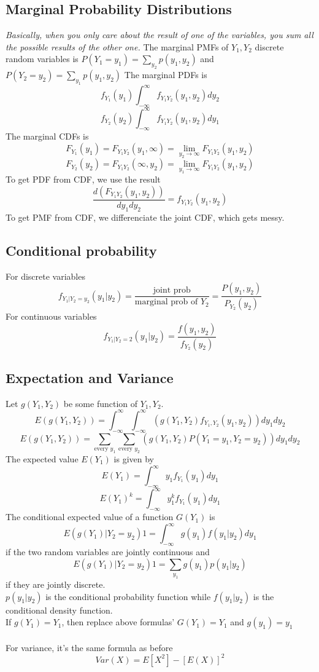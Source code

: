 \documentclass{article}
\begin{document}
\subsection{Marginal Probability Distributions}
\textit{Basically, when you only care about the result of one of the variables, you sum all the possible results of the other one.}
The marginal PMFs of $Y_1,Y_2$ discrete random variables is
$P(Y_1=y_1)=\sum_{y_2}p(y_1,y_2)$ and $P(Y_2=y_2)=\sum_{y_1}p(y_1,y_2)$
The marginal PDFs is 
\[f_{Y_1}(y_1)\int^\infty_{-\infty}f_{Y_1Y_2}(y_1,y_2)dy_2\]
\[f_{Y_2}(y_2)\int^\infty_{-\infty}f_{Y_1Y_2}(y_1,y_2)dy_1\]
The marginal CDFs is 
\[F_{Y_1}(y_1)=F_{Y_1Y_2}(y_1,\infty)=\lim_{y_2\to\infty}F_{Y_1Y_2}(y_1,y_2)\]
\[F_{Y_2}(y_2)=F_{Y_1Y_2}(\infty,y_2)=\lim_{y_1\to\infty}F_{Y_1Y_2}(y_1,y_2)\]
To get PDF from CDF, we use the result 
\[\frac{d(F_{Y_1Y_2}(y_1,y_2))}{dy_1dy_2}=f_{Y_1Y_2}(y_1,y_2)\]
To get PMF from CDF, we differenciate the joint CDF, which gets messy.
\subsection{Conditional probability}
For discrete variables
\[f_{Y_1|Y_2=y_2}(y_1|y_2)= \frac{\text{joint prob}}{\text{marginal prob of }Y_2}=\frac{P(y_1,y_2)}{P_{Y_2}(y_2)}\]
For continuous variables
\[f_{Y_1|Y_2=2}(y_1|y_2)=\frac{f(y_1,y_2)}{f_{Y_2}(y_2)}\]
\subsection{Expectation and Variance}
Let $g(Y_1,Y_2)$ be some function of $Y_1,Y_2$.
\[E(g(Y_1,Y_2))=\int^\infty_{-\infty}\int^\infty_{-\infty}(g(Y_1,Y_2)f_{Y_1,Y_2}(y_1,y_2))dy_1dy_2\]
\[E(g(Y_1,Y_2))=\sum_{\text{every }y_1}\sum_{\text{every }y_2}(g(Y_1,Y_2)P(Y_1=y_1,Y_2=y_2))dy_1dy_2\]
The expected value $E(Y_1)$ is given by
\[E(Y_1)=\int^\infty_{-\infty}y_1f_{Y_1}(y_1)dy_1\]
\[E(Y_1)^k=\int^\infty_{-\infty}y_1^kf_{Y_1}(y_1)dy_1\]
The conditional expected value of a function $G(Y_1)$ is
\[E(g(Y_1)|Y_2=y_2)1=\int^\infty_{-\infty}g(y_1)f(y_1|y_2)dy_1\]
if the two random variables are jointly continuous and 
\[E(g(Y_1)|Y_2=y_2)1=\sum_{y_1}g(y_1)p(y_1|y_2)\]
if they are jointly discrete.\\
$p(y_1|y_2)$ is the conditional probability function while $f(y_1|y_2)$ is the conditional density function.\\
If $g(Y_1)=Y_1$, then replace above formulas' $G(Y_1) = Y_1$ and $g(y_1) = y_1$
\\\\
For variance, it's the same formula as before
\[Var(X)=E[X^2]-[E(X)]^2\]
\end{document}
